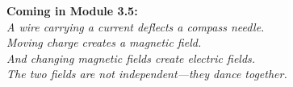 \documentclass[12pt, a4paper, twoside]{book}
\theoremstyle{disc}
\begin{document}
\vspace{0.6cm}
\begin{center}
\end{center}

\vspace{0.5cm}
\begin{center}
{\large\textcolor{deep}{\textbf{Coming in Module 3.5:}}}\\[6pt]
{\itshape\textcolor{midblue}{%
A wire carrying a current deflects a compass needle.\\[3pt]
Moving charge creates a magnetic field.\\[3pt]
And changing magnetic fields create electric fields.\\[3pt]
The two fields are not independent---they dance together.
}}
\end{center}
\end{document}

